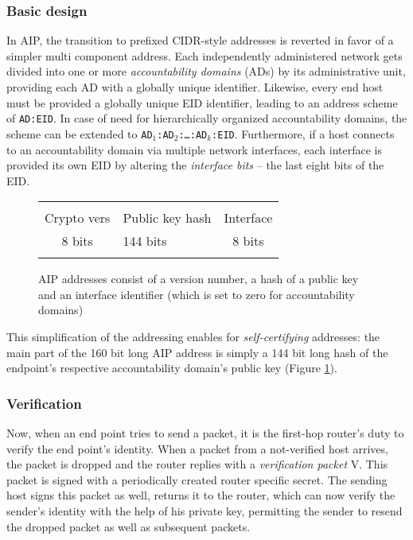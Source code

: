 \documentclass{acm_proc_article-sp}
\begin{document}
\subsubsection{Basic design}
\label{sec:aipbd}

In AIP, the transition to prefixed CIDR-style addresses is reverted in favor of a simpler multi component address. Each independently administered network gets divided into one or more \emph{accountability domains} (ADs) by its administrative unit, providing each AD with a globally unique identifier. Likewise, every end host must be provided a globally unique EID identifier, leading to an address scheme of \texttt{AD:EID}. In case of need for hierarchically organized accountability domains, the scheme can be extended to \texttt{AD$_1$:AD$_2$:\ldots:AD$_k$:EID}. Furthermore, if a host connects to an accountability domain via multiple network interfaces, each interface is provided its own EID by altering the \emph{interface bits} -- the last eight bits of the EID.

\begin{figure}[h!]
	\label{fig:aipadr}
	\begin{tabularx}{0.47\textwidth}{|c|C|c|}
		\hline & & \\
 		Crypto vers & Public key hash & Interface \\
		8 bits & 144 bits & 8 bits \\ & & \\
		\hline
	\end{tabularx}
	\caption{AIP addresses consist of a version number, a hash of a public key and an interface identifier 		(which is set to zero for accountability domains) \cite{aip}}
\end{figure}

This simplification of the addressing enables for \emph{self-certifying} addresses: the main part of the 160 bit long AIP address is simply a 144 bit long hash of the endpoint's respective accountability domain's public key (Figure \ref{fig:aipadr}).

\subsubsection{Verification}

Now, when an end point tries to send a packet, it is the first-hop router's duty to verify the end point's identity. When a packet from a not-verified host arrives, the packet is dropped and the router replies with a \emph{verification packet} V. This packet is signed with a periodically created router specific secret. The sending host signs this packet as well, returns it to the router, which can now verify the sender's identity with the help of his private key, permitting the sender to resend the dropped packet as well as subsequent packets.
\end{document}
